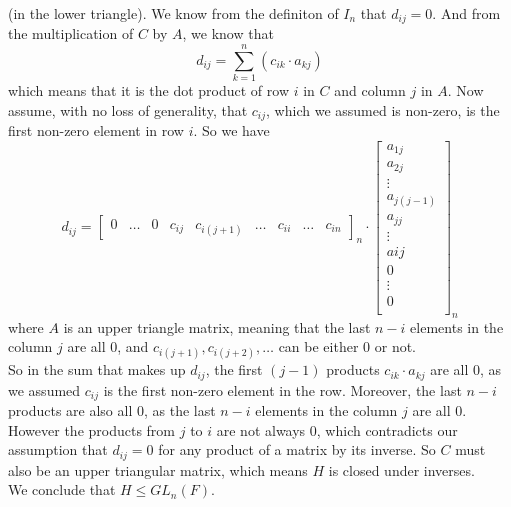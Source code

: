 \documentclass[12pt]{article}
\begin{document}
    (in the lower triangle).
    We know from the definiton of $I_n$ that $d_{ij} = 0$.
    And from the multiplication of $C$ by $A$,
    we know that 
    \[ d_{ij} = \sum_{k = 1}^n (c_{ik} \cdot a_{kj}) \]
    which means that it is the dot product of row $i$ in $C$
    and column $j$ in $A$.
    Now assume, with no loss of generality,
    that $c_{ij}$, which we assumed is non-zero,
    is the first non-zero element in row $i$.
    So we have 
    \[ d_{ij} = \begin{bmatrix}
        0 & \dots & 0 & c_{ij} & c_{i(j+1)} & \dots
        & c_{ii} & \dots & c_{in}  
    \end{bmatrix}_{n}
    \cdot 
    \begin{bmatrix}
        a_{1j} \\ a_{2j} \\ \vdots \\ a_{j(j - 1)} \\ a_{jj} \\ \vdots
        \\ a{ij} \\ 0 \\ \vdots \\ 0 \\  
    \end{bmatrix}_{n} \]
    where $A$ is an upper triangle matrix, meaning that the last 
    $n - i$ elements in the column $j$ are all 0,
    and $c_{i(j + 1)}, c_{i(j + 2)}, \dots$ can be either 0 or not. \\
    So in the sum that makes up $d_{ij}$,
    the first $(j - 1)$ products $c_{ik} \cdot a_{kj}$ are all 0,
    as we assumed $c_{ij}$ is the first non-zero element in the row.
    Moreover, the last $n - i$ products are also all 0,
    as the last $n - i$ elements in the column $j$ are all 0.
    However the products from $j$ to $i$ are not always 0,
    which contradicts our assumption that $d_{ij} = 0$
    for any product of a matrix by its inverse.
    So $C$ must also be an upper triangular matrix,
    which means $H$ is closed under inverses. \\
    We conclude that $H \leqslant GL_n(F)$.
\end{document}
